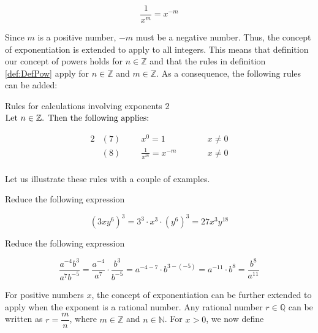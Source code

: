 \begin{equation*}
 \frac{1}{x^m} = x^{-m}   
\end{equation*}

Since \(m\) is a positive number, \(-m\) must be a negative number. Thus, the concept of exponentiation is extended to apply to all integers. This means that definition our concept of powers holds for \(n \in \mathbb{Z}\) and that the rules in definition \ref{def:DefPow} apply for \(n \in \mathbb{Z}\) and \(m \in \mathbb{Z}\). As a consequence, the following rules can be added:
\begin{custombox}{Rules for calculations involving exponents 2}
$\textnormal{Let } n \in \mathbb{Z} \textnormal{. Then the following applies:}$
\begin{fleqn}
\begin{alignat*}{2}
&(7) \hspace{1cm} x^0=1   &\qquad&   x \neq 0  \\
&(8) \hspace{1cm} \frac{1}{x^m}=x^{-m} &\qquad& x \neq 0 \\
\end{alignat*}
\end{fleqn}
\end{custombox}

Let us illustrate these rules with a couple of examples.

\newpage

\begin{example} Reduce the following expression

    \begin{equation*}
\left(3 x y^6\right)^3=3^3 \cdot x^3 \cdot\left(y^6\right)^3=27 x^3 y^{18}
\end{equation*}
\end{example}

\begin{example} Reduce the following expression

\begin{equation*}
\frac{a^{-4} b^3}{a^7 b^{-5}}=\frac{a^{-4}}{a^7} \cdot \frac{b^3}{b^{-5}}=a^{-4-7} \cdot b^{3-(-5)}=a^{-11} \cdot b^8=\frac{b^8}{a^{11}}
\end{equation*}
\end{example}

For positive numbers \(x\), the concept of exponentiation can be further extended to apply when the exponent is a rational number. Any rational number \(r \in \mathbb{Q}\) can be written as \(r = \dfrac{m}{n}\), where \(m \in \mathbb{Z}\) and \(n \in \mathbb{N}\). For \(x > 0\), we now define

